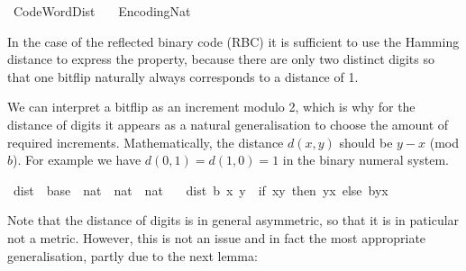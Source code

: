 %
\begin{isabellebody}%
%
%
\isadelimdocument
%
\endisadelimdocument
%
\isatagdocument
%
\isamarkuptrue%
%
\endisatagdocument
{\isafolddocument}%
%
\isadelimdocument
%
\endisadelimdocument
%
\isadelimtheory
%
\endisadelimtheory
%
\isatagtheory
{}\isamarkupfalse%
\ Code{\isacharunderscore}{\kern0pt}Word{\isacharunderscore}{\kern0pt}Dist\isanewline
\ \ \ Encoding{\isacharunderscore}{\kern0pt}Nat\isanewline
{}%
\endisatagtheory
{\isafoldtheory}%
%
\isadelimtheory
%
\endisadelimtheory
%
\begin{isamarkuptext}%
In the case of the reflected binary code (RBC) it is sufficient
  to use the Hamming distance to express the property, because there are
  only two distinct digits so that one bitflip naturally always corresponds
  to a distance of 1.%
\end{isamarkuptext}\isamarkuptrue%
%
\isadelimdocument
%
\endisadelimdocument
%
\isatagdocument
%
\isamarkuptrue%
%
\endisatagdocument
{\isafolddocument}%
%
\isadelimdocument
%
\endisadelimdocument
%
\begin{isamarkuptext}%
We can interpret a bitflip as an increment modulo 2, which is why for the
  distance of digits it appears as a natural generalisation to choose the
  amount of required increments.
Mathematically, the distance $d(x,y)$ should be $y-x$ (mod $b$).
For example we have $d(0,1) = d(1,0) = 1$ in the binary numeral system.%
\end{isamarkuptext}\isamarkuptrue%
\isamarkupfalse%
\ dist{}\ {\isacharcolon}{\kern0pt}{\isacharcolon}{\kern0pt}\ {\isachardoublequoteopen}base\ {\isasymRightarrow}\ nat\ {\isasymRightarrow}\ nat\ {\isasymRightarrow}\ nat{\isachardoublequoteclose}\ \isanewline
\ \ {\isachardoublequoteopen}dist{}\ b\ x\ y\ {\isasymequiv}\ if\ x{\isasymle}y\ then\ y{\isacharminus}{\kern0pt}x\ else\ b{\isacharplus}{\kern0pt}y{\isacharminus}{\kern0pt}x{\isachardoublequoteclose}%
\begin{isamarkuptext}%
Note that the distance of digits is in general asymmetric, so that it is
  in paticular not a metric. However, this is not an issue and in fact the
  most appropriate generalisation, partly due to the next lemma:%
\end{isamarkuptext}\isamarkuptrue%

\end{isabellebody}
